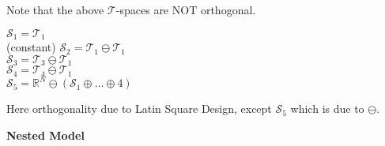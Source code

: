 \documentclass[11pt,fleqn]{book} %
\begin{document}
Note that the above $\mathcal{T}$-spaces are NOT orthogonal. 

$\mathcal{S}_1 = \mathcal{T}_1$\\ (constant)
$\mathcal{S}_2 = \mathcal{T}_1 \ominus \mathcal{T}_1$\\ 
$\mathcal{S}_3 = \mathcal{T}_3 \ominus \mathcal{T}_1$\\ 
$\mathcal{S}_4 = \mathcal{T}_4 \ominus \mathcal{T}_1$\\ 
$\mathcal{S}_5 = \mathbb{R}^N \ominus (\mathcal{S}_1 \oplus \dots \oplus \mathcal{4})$ 

Here orthogonality due to Latin Square Design, except $\mathcal{S}_5$ which is due to $\ominus$. 

\textbf{Nested Model}
















\end{document}
